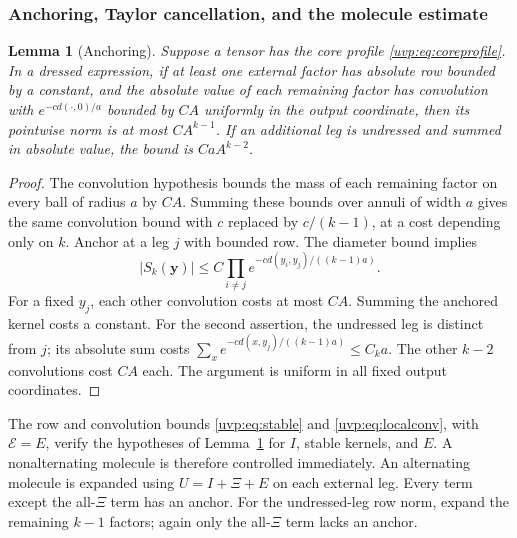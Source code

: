 \documentclass[11pt]{article}
\numberwithin{equation}{section}
\newtheorem{lemma}[theorem]{Lemma}
\theoremstyle{remark}
\begin{document}
\subsubsection{Anchoring, Taylor cancellation, and the molecule estimate}
\begin{lemma}[Anchoring]\label{uvp:lem:anchor}
Suppose a tensor has the core profile \eqref{uvp:eq:coreprofile}.
In a dressed expression, if at least one external factor has absolute
row bounded by a constant, and the absolute value of each remaining
factor has convolution with $e^{-c d(\cdot,0)/a}$ bounded by $CA$
uniformly in the output coordinate, then its
pointwise norm is at most $CA^{k-1}$. If an additional leg is
undressed and summed in absolute value, the bound is
$CaA^{k-2}$.
\end{lemma}
\begin{proof}
The convolution hypothesis bounds the mass of each remaining factor
on every ball of radius $a$ by $CA$. Summing these bounds over annuli
of width $a$ gives the same convolution bound with $c$ replaced by
$c/(k-1)$, at a cost depending only on $k$.
Anchor at a leg $j$ with bounded row. The diameter bound implies
\[
 |S_k(\boldsymbol y)|\le C
  \prod_{i\ne j}e^{-c d(y_i,y_j)/((k-1)a)}.
\]
For a fixed $y_j$, each other convolution costs at most $CA$.
Summing the anchored kernel costs a constant. For the second assertion,
the undressed leg is distinct from $j$; its absolute sum costs
$\sum_x e^{-c d(x,y_j)/((k-1)a)}\le C_k a$. The other $k-2$ convolutions
cost $CA$ each. The argument is uniform in all fixed output coordinates.
\end{proof}

The row and convolution bounds \eqref{uvp:eq:stable} and
\eqref{uvp:eq:localconv}, with $\mathcal E=E$, verify the hypotheses of
Lemma~\ref{uvp:lem:anchor} for $I$, stable kernels, and $E$.
A nonalternating molecule is therefore controlled immediately.
An alternating molecule is expanded using $U=I+\Xi+E$ on each
external leg. Every term except the all-$\Xi$ term has an anchor.
For the undressed-leg row norm, expand the remaining $k-1$ factors;
again only the all-$\Xi$ term lacks an anchor.
\end{document}
